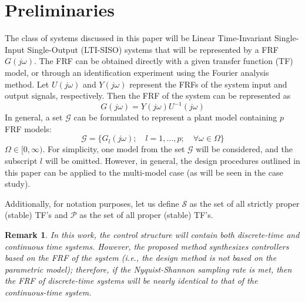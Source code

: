 \documentclass[a4paper, 10pt, conference]{ieeeconf}
\newtheorem*{remark}{Remark}
\newcommand{\jo}{(j\omega)}
\begin{document}
\section{Preliminaries}
\label{sec:prelim}
The class of systems discussed in this paper will be Linear Time-Invariant Single-Input Single-Output (LTI-SISO) systems that will be represented by a FRF $G\jo$.  The FRF can be obtained directly with a given transfer function (TF) model, or through an identification experiment using the Fourier analysis method. Let $U\jo$ and $Y\jo$ represent the FRFs of the system input and output signals, respectively. Then the FRF of the system can be represented as 
\begin{equation}
G\jo = Y\jo U^{-1}\jo
\end{equation}
In general, a set $\mathcal{G}$ can be formulated to represent a plant model containing $p$ FRF models:
\begin{equation}
\mathcal{G} = \{G_l\jo; \quad l=1,\ldots,p; \quad \forall \omega \in \Omega\}
\end{equation} 
$\Omega \in [0,\infty)$. For simplicity, one model from the set $\mathcal{G}$ will be considered, and the subscript $l$ will be omitted. However, in general, the design procedures outlined in this paper can be applied to the multi-model case (as will be seen in the case study). 

Additionally, for notation purposes, let us define $\mathscr{S}$ as the set of all strictly proper (stable) TF's and $\mathscr{P}$ as the set of all proper (stable) TF's. 

\begin{remark}
In this work, the control structure will contain both discrete-time and continuous time systems. However, the proposed method synthesizes controllers based on the FRF of the system (i.e., the design method is not based on the parametric model); therefore, if the Nyquist-Shannon sampling rate is met, then the FRF of discrete-time systems will be nearly identical to that of the continuous-time system.
\end{remark}
\end{document}
